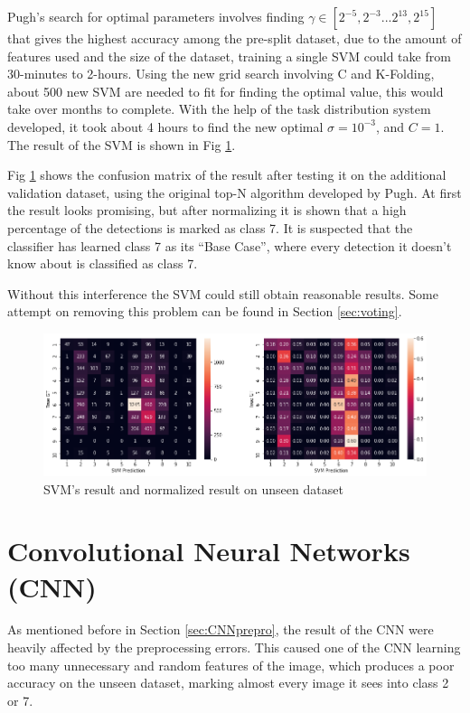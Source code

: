 \documentclass[bsc,logo,twoside,fullspacing,parskip]{infthesis}
\begin{document}
Pugh's search for optimal parameters involves finding \(\gamma\in[2^{-5},2^{-3}...2^{13},2^{15}]\) that gives the highest accuracy among the pre-split dataset, due to the amount of features used and the size of the dataset, training a single SVM could take from 30-minutes to 2-hours. Using the new grid search involving C and K-Folding, about 500 new SVM are needed to fit for finding the optimal value, this would take over months to complete.
With the help of the task distribution system developed, it took about 4 hours to find the
new optimal \(\sigma = 10^{-3}\), and \(C = 1\).
The result of the SVM is shown in Fig \ref{fig:svmacc}.

Fig \ref{fig:svmacc} shows the confusion matrix of the result after testing it on the additional validation dataset, using the original top-N algorithm developed by Pugh\cite{Pugh}. At first the result looks promising, but after normalizing it is shown that a high percentage of the detections is marked as class 7.
It is suspected that the classifier has learned class 7 as its ``Base Case'', where every detection it doesn't know about is classified as class 7.

Without this interference the SVM could still obtain reasonable results.
Some attempt on removing this problem can be found in Section \ref{sec:voting}.

\begin{figure}[h]
\centering
    \includegraphics[scale=0.44]{graph/svmresult.png}
    \caption{SVM's result and normalized result on unseen dataset}
    \label{fig:svmacc}
\end{figure} 

\section{Convolutional Neural Networks (CNN)}
\label{sec:cnn}

As mentioned before in Section \ref{sec:CNNprepro}, the result of the CNN were heavily affected by the preprocessing errors. This caused one of the CNN learning too many unnecessary and random features of the image, which produces a poor accuracy on the unseen dataset, marking almost every image it sees into class 2 or 7. 
\end{document}
